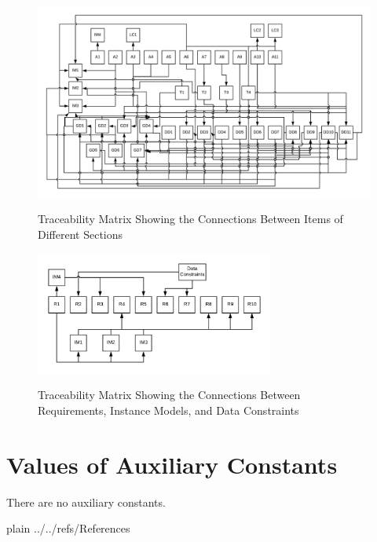 \documentclass[12pt]{article}
\begin{document}
\begin{figure}[h!]
	\begin{center}
		{
			\includegraphics[width=\textwidth]{ATrace.png}
		}
		\caption{\label{Fig_ATrace} Traceability Matrix Showing the Connections 
		Between Items of Different Sections}
	\end{center}
\end{figure}


\begin{figure}[h!]
	\begin{center}
		{
			\includegraphics[width=0.7\textwidth]{RTrace.png}
		}
		\caption{\label{Fig_RTrace} Traceability Matrix Showing the Connections 
		Between Requirements, Instance Models, and Data Constraints}
	\end{center}
\end{figure}

\section{Values of Auxiliary Constants}
There are no auxiliary constants.


\newpage

 {plain}
 {../../refs/References}
\end{document}
